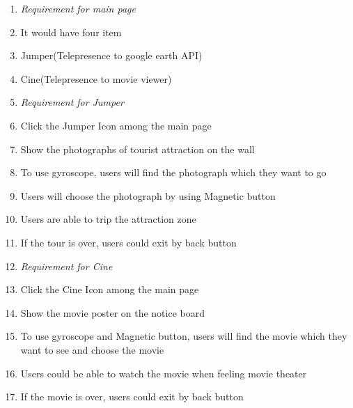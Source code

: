 \documentclass{article}
\begin{document}
\begin{enumerate}
\item  \textit{Requirement for main page}

\item \textit{ }It would  have four item\textit{}

\item \textit{ }Jumper(Telepresence to google earth API)\textit{}

\item \textit{ }Cine(Telepresence to movie viewer)\textit{}

\item \textit{ Requirement for Jumper}

\item \textit{ }Click the Jumper Icon among the main page\textit{}

\item \textit{ }Show the photographs of tourist attraction on the wall\textit{}

\item \textit{ }To use gyroscope, users will  find the photograph which they want to go\textit{}

\item \textit{ }Users will choose the photograph by using Magnetic button\textit{}

\item \textit{ }Users are able to trip the attraction zone\textit{}

\item \textit{ }If the tour is over, users could exit by back button\textit{}

\item \textit{ Requirement for Cine}

\item \textit{ }Click the Cine Icon among the main page\textit{}

\item \textit{ }Show the movie poster on the notice board\textit{}

\item \textit{ }To use gyroscope and Magnetic button, users will find the movie which they want to see and choose the movie\textit{}

\item \textit{ }Users could be able to watch the movie when feeling movie theater\textit{}

\item \textit{ }If the movie is over, users could exit by back button\textit{}
\end{enumerate}
\end{document}
